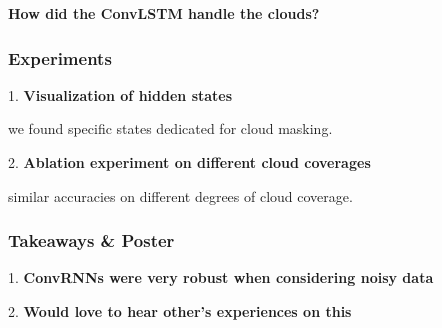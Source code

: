 \documentclass[%
  aspectratio=169,
  9pt,
ngerman,
  light,
  mathserif,
  professionalfont,
  affiliationintitlepagehead,
  titlegraphic,
   affiliation,
   navigationbar,
  progressbar,
]{beamer}
\begin{document}
\begin{frame}
\LARGE
\centering
\textbf{How did the ConvLSTM handle the clouds?}
\end{frame}


\begin{frame}
\frametitle{Experiments}
\LARGE
1. \textbf{Visualization of hidden states}

{\hspace{2em} we found specific states dedicated for cloud masking.}

\vspace{2em}
2. \textbf{Ablation experiment on different cloud coverages} 

{\hspace{2em} similar accuracies on different degrees of cloud coverage.}

\end{frame}

\begin{frame}
	\frametitle{Takeaways \& Poster}
	
	\LARGE
	1. \textbf{ConvRNNs were very robust when considering noisy data}
	
	\vspace{2em}
	2. \textbf{Would love to hear other's experiences on this}
	
\end{frame}


%
%
%
\end{document}
